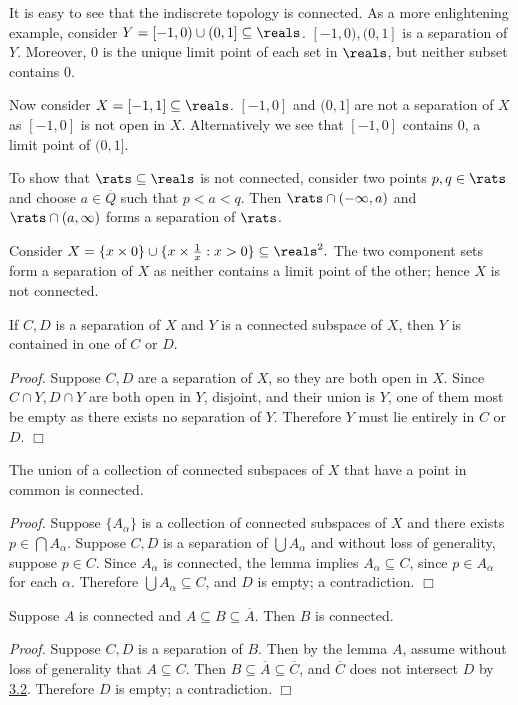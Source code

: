It is easy to see that the indiscrete topology is connected. As a more enlightening example, consider $Y = [-1, 0) \cup (0, 1] \subseteq \reals$. $[-1, 0), (0, 1]$ is a separation of $Y$. Moreover, $0$ is the unique limit point of each set in $\reals$, but neither subset contains $0$.

Now consider $X = [-1, 1] \subseteq \reals$. $[-1, 0]$ and $(0, 1]$ are not a separation of $X$ as $[-1, 0]$ is not open in $X$. Alternatively we see that $[-1, 0]$ contains $0$, a limit point of $(0, 1]$.

To show that $\rats \subseteq \reals$ is not connected, consider two points $p, q \in \rats$ and choose $a \in \overline{Q}$ such that $p < a < q$. Then $\rats \cap (-\infty, a)$ and $\rats \cap (a, \infty)$ forms a separation of $\rats$.

Consider $X = \{x \times 0\} \cup \{x \times \frac1x: x > 0\} \subseteq \reals^2.$ The two component sets form a separation of $X$ as neither contains a limit point of the other; hence $X$ is not connected.

\begin{lemma}\label{3.3}
    If $C, D$ is a separation of $X$ and $Y$ is a connected subspace of $X$, then $Y$ is contained in one of $C$ or $D$.
\end{lemma}
{\it Proof.} Suppose $C,D$ are a separation of $X$, so they are both open in $X$. Since $C \cap Y, D \cap Y$ are both open in $Y$, disjoint, and their union is $Y$, one of them most be empty as there exists no separation of $Y$. Therefore $Y$ must lie entirely in $C$ or $D$. $\Box$

\begin{theorem}\label{3.4}
    The union of a collection of connected subspaces of $X$ that have a point in common is connected.
\end{theorem}
{\it Proof.} Suppose $\{A_\alpha\}$ is a collection of connected subspaces of $X$ and there exists $p \in \bigcap A_\alpha$. Suppose $C, D$ is a separation of $\bigcup A_\alpha$ and without loss of generality, suppose $p \in C$. Since $A_\alpha$ is connected, the lemma implies $A_\alpha \subseteq C$, since $p \in A_\alpha$ for each $\alpha$. Therefore $\bigcup A_\alpha \subseteq C$, and $D$ is empty; a contradiction. $\Box$

\begin{theorem}\label{3.5}
    Suppose $A$ is connected and $A \subseteq B \subseteq \overline{A}$. Then $B$ is connected.
\end{theorem}
{\it Proof.} Suppose $C, D$ is a separation of $B$. Then by the lemma $A$, assume without loss of generality that $A \subseteq C$. Then $B \subseteq \overline{A} \subseteq \overline{C}$, and $\overline{C}$ does not intersect $D$ by \hyperref[3.2]{3.2}. Therefore $D$ is empty; a contradiction. $\Box$

